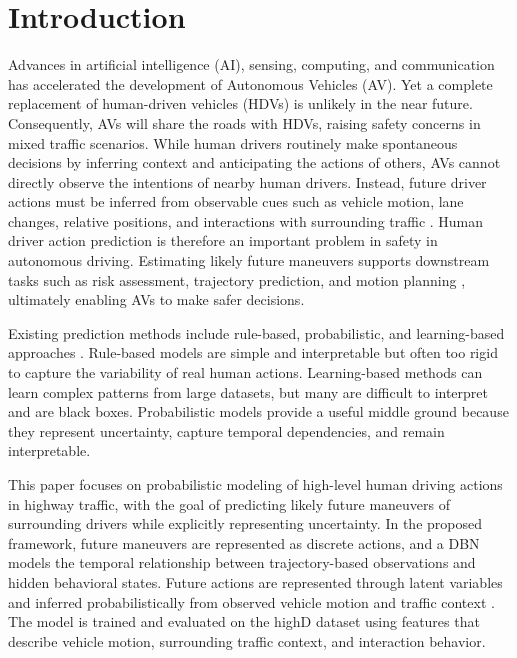 \documentclass[upint,subscriptcorrection,varvw,hyphenate,balance,greek,russian,vietnamese,german]{asmeconf} %
\begin{document}
\section{Introduction}
Advances in artificial intelligence (AI), sensing, computing, and communication has accelerated the development of Autonomous Vehicles (AV). 
Yet a complete replacement of human-driven vehicles (HDVs) is unlikely in the near future. Consequently, AVs will share the 
roads with HDVs, raising safety concerns in mixed traffic scenarios. While human drivers routinely make spontaneous decisions by inferring context and anticipating the actions of others, AVs cannot directly observe the intentions of nearby human drivers. 
Instead, future driver actions must be inferred from observable cues such as vehicle motion, lane changes, relative positions, and interactions with surrounding traffic \cite{Schwarting2018}. Human driver action prediction is therefore an important problem in safety in autonomous driving. Estimating likely future maneuvers supports downstream 
tasks such as risk assessment, trajectory prediction, and motion planning \cite{Lefevre2014,Madjid_2026,Schwarting2018}, ultimately enabling AVs to make safer decisions. 

Existing prediction methods include rule-based, probabilistic, and learning-based approaches \cite{10054035,Rudenko_2020,Lefevre2014}. 
Rule-based models are simple and interpretable but often too rigid to capture the variability of real human actions. Learning-based methods can 
learn complex patterns from large datasets, but many are difficult to interpret and are black boxes. 
Probabilistic models provide a useful middle ground because they represent uncertainty, capture temporal dependencies, and remain interpretable.

This paper focuses on probabilistic modeling of high-level human driving actions in highway traffic, with the goal of predicting likely future maneuvers 
of surrounding drivers while explicitly representing uncertainty. 
In the proposed framework, future maneuvers are represented as discrete actions, and a DBN models the temporal relationship between 
trajectory-based observations and hidden behavioral states. 
Future actions are represented through latent variables and inferred probabilistically from observed vehicle motion and traffic context \cite{murphy2002dynamic}. 
The model is trained and evaluated on the highD dataset \cite{krajewski2018highddatasetdronedataset} using features that describe vehicle motion, 
surrounding traffic context, and interaction behavior.
\end{document}
